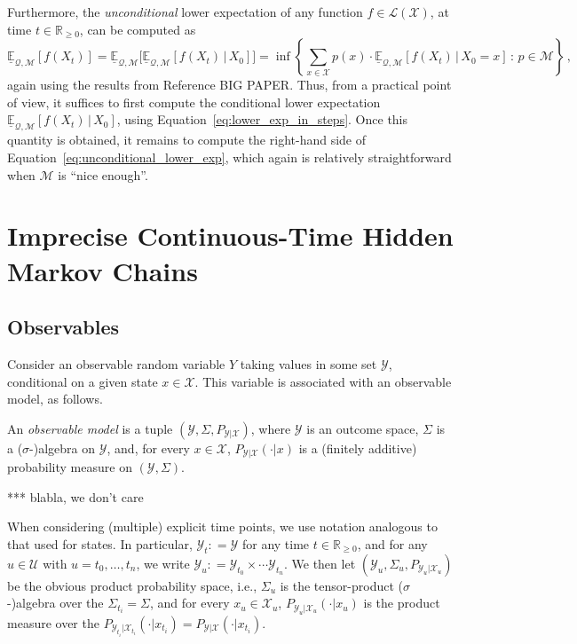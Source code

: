 \documentclass[twoside,11pt]{article}
\newcommand{\reals}{\mathbb{R}}
\newcommand{\realsnonneg}{\reals_{\geq 0}}
\newcommand{\states}{\mathcal{X}}
\newcommand{\observs}{\mathcal{Y}}
\newcommand{\gambles}{\mathcal{L}}
\newcommand{\gamblesX}{\gambles(\states)}
\newcommand{\rateset}{\mathcal{Q}}
\newcommand{\coloneqq}{:\!=}
\begin{document}
Furthermore, the \emph{unconditional} lower expectation of any function $f\in\gamblesX$, at time $t\in\realsnonneg$, can be computed as
\begin{equation}\label{eq:unconditional_lower_exp}
\underline{\mathbb{E}}_{\rateset,\mathcal{M}}[f(X_t)] = \underline{\mathbb{E}}_{\rateset,\mathcal{M}}\bigl[\underline{\mathbb{E}}_{\rateset,\mathcal{M}}[f(X_t)\,\vert\,X_0]\bigr] = \inf\left\{ \sum_{x\in\states} p(x)\cdot\underline{\mathbb{E}}_{\rateset,\mathcal{M}}[f(X_t)\,\vert\,X_0=x]\,:\,p\in\mathcal{M}  \right\}\,,
\end{equation}
again using the results from Reference BIG PAPER. Thus, from a practical point of view, it suffices to first compute the conditional lower expectation $\underline{\mathbb{E}}_{\rateset,\mathcal{M}}[f(X_t)\,\vert\,X_0]$, using Equation~\eqref{eq:lower_exp_in_steps}. Once this quantity is obtained, it remains to compute the right-hand side of Equation~\eqref{eq:unconditional_lower_exp}, which again is relatively straightforward when $\mathcal{M}$ is ``nice enough''.

\section{Imprecise Continuous-Time Hidden Markov Chains}\label{sec:icthmc}

\subsection{Observables}

Consider an observable random variable $Y$ taking values in some set $\observs$, conditional on a given state $x\in\states$. This variable is associated with an observable model, as follows.

\begin{definition}
An \emph{observable model} is a tuple $(\observs,\Sigma,P_{\observs\vert \states})$, where $\observs$ is an outcome space, $\Sigma$ is a ($\sigma$-)algebra on $\observs$, and, for every $x\in\states$, $P_{\observs\vert\states}(\cdot\vert x)$ is a (finitely additive) probability measure on $(\observs,\Sigma)$.
\end{definition}
*** blabla, we don't care

When considering (multiple) explicit time points, we use notation analogous to that used for states. In particular, $\observs_t\coloneqq\observs$ for any time $t\in\realsnonneg$, and for any $u\in\mathcal{U}$ with $u=t_0,\ldots,t_n$, we write $\observs_u\coloneqq \observs_{t_0}\times\cdots\observs_{t_n}$. We then let $(\observs_u,\Sigma_u,P_{\observs_u\vert\states_u})$ be the obvious product probability space, i.e., $\Sigma_u$ is the tensor-product ($\sigma$-)algebra over the $\Sigma_{t_i}=\Sigma$, and for every $x_u\in\states_u$, $P_{\observs_u\vert\states_u}(\cdot\vert x_u)$ is the product measure over the $P_{\observs_{t_i}\vert\states_{t_i}}(\cdot\vert x_{t_i})=P_{\observs\vert\states}(\cdot\vert x_{t_i})$.
\end{document}
